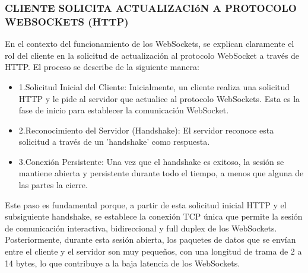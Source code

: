 \documentclass{report}
\begin{document}
\subsubsection{CLIENTE SOLICITA ACTUALIZACIóN A PROTOCOLO WEBSOCKETS (HTTP)}
En el contexto del funcionamiento de los WebSockets, se  explican claramente el rol del cliente en la solicitud de actualización 
al protocolo WebSocket a través de HTTP.
El proceso se describe de la siguiente manera:
\begin{itemize}
    \item 1.Solicitud Inicial del Cliente: Inicialmente, un cliente realiza una solicitud HTTP y le pide al servidor que actualice al protocolo 
    WebSockets. Esta es la fase de inicio para establecer la comunicación WebSocket.
    \item 2.Reconocimiento del Servidor (Handshake): El servidor reconoce esta solicitud a través de un 'handshake' como respuesta.
    \item 3.Conexión Persistente: Una vez que el handshake es exitoso, la sesión se mantiene abierta y persistente durante todo el tiempo, a 
    menos que alguna de las partes la cierre.
\end{itemize}
Este paso es fundamental porque, a partir de esta solicitud inicial HTTP y el subsiguiente handshake, se establece la conexión TCP única que 
permite la sesión de comunicación interactiva, bidireccional y full duplex de los WebSockets. Posteriormente, durante esta sesión abierta, 
los paquetes de datos que se envían entre el cliente y el servidor son muy pequeños, con una longitud de trama de 2 a 14 bytes, lo que contribuye 
a la baja latencia de los WebSockets.
\end{document}
